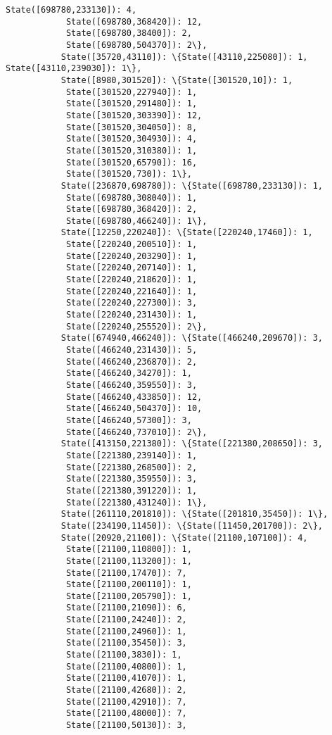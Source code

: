 \documentclass[11pt]{article}
\begin{document}
\begin{Verbatim}[commandchars=\\\{\}]
            State([698780,233130]): 4,
            State([698780,368420]): 12,
            State([698780,38400]): 2,
            State([698780,504370]): 2\},
           State([35720,43110]): \{State([43110,225080]): 1, State([43110,239030]): 1\},
           State([8980,301520]): \{State([301520,10]): 1,
            State([301520,227940]): 1,
            State([301520,291480]): 1,
            State([301520,303390]): 12,
            State([301520,304050]): 8,
            State([301520,304930]): 4,
            State([301520,310380]): 1,
            State([301520,65790]): 16,
            State([301520,730]): 1\},
           State([236870,698780]): \{State([698780,233130]): 1,
            State([698780,308040]): 1,
            State([698780,368420]): 2,
            State([698780,466240]): 1\},
           State([12250,220240]): \{State([220240,17460]): 1,
            State([220240,200510]): 1,
            State([220240,203290]): 1,
            State([220240,207140]): 1,
            State([220240,218620]): 1,
            State([220240,221640]): 1,
            State([220240,227300]): 3,
            State([220240,231430]): 1,
            State([220240,255520]): 2\},
           State([674940,466240]): \{State([466240,209670]): 3,
            State([466240,231430]): 5,
            State([466240,236870]): 2,
            State([466240,34270]): 1,
            State([466240,359550]): 3,
            State([466240,433850]): 12,
            State([466240,504370]): 10,
            State([466240,57300]): 3,
            State([466240,737010]): 2\},
           State([413150,221380]): \{State([221380,208650]): 3,
            State([221380,239140]): 1,
            State([221380,268500]): 2,
            State([221380,359550]): 3,
            State([221380,391220]): 1,
            State([221380,431240]): 1\},
           State([261110,201810]): \{State([201810,35450]): 1\},
           State([234190,11450]): \{State([11450,201700]): 2\},
           State([20920,21100]): \{State([21100,107100]): 4,
            State([21100,110800]): 1,
            State([21100,113200]): 1,
            State([21100,17470]): 7,
            State([21100,200110]): 1,
            State([21100,205790]): 1,
            State([21100,21090]): 6,
            State([21100,24240]): 2,
            State([21100,24960]): 1,
            State([21100,35450]): 3,
            State([21100,3830]): 1,
            State([21100,40800]): 1,
            State([21100,41070]): 1,
            State([21100,42680]): 2,
            State([21100,42910]): 7,
            State([21100,48000]): 7,
            State([21100,50130]): 3,

\end{Verbatim}
\end{document}
